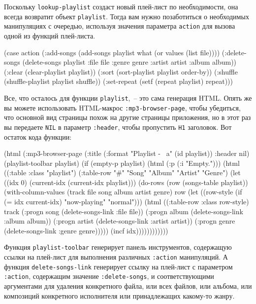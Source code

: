 Поскольку \lstinline{lookup-playlist} создаст новый плей-лист по необходимости, она всегда
возвратит объект \lstinline{playlist}. Тогда вам нужно позаботиться о необходимых манипуляциях
с очередью, используя значения параметра \lstinline{action} для вызова одной из функций
плей-листа.

\begin{myverb}
(case action
  (:add-songs      (add-songs playlist what (or values (list file))))
  (:delete-songs   (delete-songs playlist :file file :genre genre
                    :artist artist :album album))
  (:clear          (clear-playlist playlist))
  (:sort           (sort-playlist playlist order-by))
  (:shuffle        (shuffle-playlist playlist shuffle))
  (:set-repeat     (setf (repeat playlist) repeat)))
\end{myverb}

Все, что осталось для функции \lstinline{playlist},~-- это сама генерация HTML. Опять же вы можете
использовать HTML-макрос \lstinline{:mp3-browser-page}, чтобы убедиться, что основной вид
страницы похож на другие страницы приложения, но в этот раз вы передаете \lstinline{NIL} в
параметр \lstinline{:header}, чтобы пропустить \lstinline{H1} заголовок. Вот остаток кода функции:

\begin{myverb}
(html
 (:mp3-browser-page
  (:title (:format "Playlist - ~a" (id playlist)) :header nil)
  (playlist-toolbar playlist)
  (if (empty-p playlist)
    (html (:p (:i "Empty.")))
    (html 
      ((:table :class "playlist")
       (:table-row "#" "Song" "Album" "Artist" "Genre")
       (let ((idx 0)
             (current-idx (current-idx playlist)))
         (do-rows (row (songs-table playlist))
           (with-column-values (track file song album artist genre) row
             (let ((row-style (if (= idx current-idx) "now-playing" "normal")))
               (html
                 ((:table-row :class row-style)
                  track
                  (:progn song   (delete-songs-link :file file))
                  (:progn album  (delete-songs-link :album album))
                  (:progn artist (delete-songs-link :artist artist))
                  (:progn genre  (delete-songs-link :genre genre)))))
             (incf idx))))))))))))
\end{myverb}

Функция \lstinline{playlist-toolbar} генерирует панель инструментов, содержащую ссылки на
плей-лист для выполнения различных \lstinline{:action} манипуляций. А функция
\lstinline{delete-songs-link} генерирует ссылку на плей-лист с параметром \lstinline{:action},
содержащим значение \lstinline{:delete-songs}, и соответствующими аргументами для удаления
конкретного файла, или всех файлов, или альбома, или композиций конкретного исполнителя или
принадлежащих какому-то жанру.

